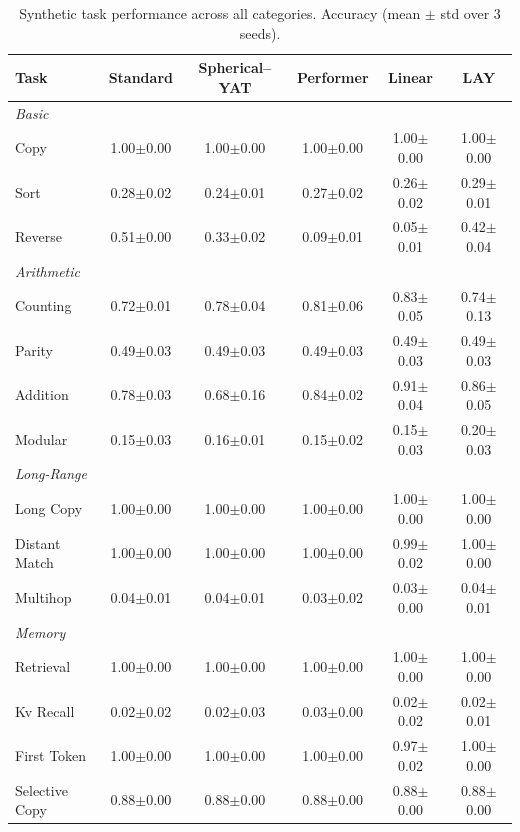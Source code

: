 \documentclass{article}
\begin{document}
\setlength{\textfloatsep}{8pt}
\begin{table}[t]
\centering
\small
\caption{Synthetic task performance across all categories. Accuracy (mean $\pm$ std over 3 seeds).}
\label{tab:tasks-all}
\begin{tabular}{lccccc}
\toprule
Task & Standard & Spherical--YAT & Performer & Linear & LAY \\
\midrule
\multicolumn{6}{l}{\emph{Basic}} \\
Copy            & 1.00$\pm$0.00 & 1.00$\pm$0.00 & 1.00$\pm$0.00 & 1.00$\pm$0.00 & 1.00$\pm$0.00 \\
Sort            & 0.28$\pm$0.02 & 0.24$\pm$0.01 & 0.27$\pm$0.02 & 0.26$\pm$0.02 & 0.29$\pm$0.01 \\
Reverse         & 0.51$\pm$0.00 & 0.33$\pm$0.02 & 0.09$\pm$0.01 & 0.05$\pm$0.01 & 0.42$\pm$0.04 \\
\midrule
\multicolumn{6}{l}{\emph{Arithmetic}} \\
Counting        & 0.72$\pm$0.01 & 0.78$\pm$0.04 & 0.81$\pm$0.06 & 0.83$\pm$0.05 & 0.74$\pm$0.13 \\
Parity          & 0.49$\pm$0.03 & 0.49$\pm$0.03 & 0.49$\pm$0.03 & 0.49$\pm$0.03 & 0.49$\pm$0.03 \\
Addition        & 0.78$\pm$0.03 & 0.68$\pm$0.16 & 0.84$\pm$0.02 & 0.91$\pm$0.04 & 0.86$\pm$0.05 \\
Modular         & 0.15$\pm$0.03 & 0.16$\pm$0.01 & 0.15$\pm$0.02 & 0.15$\pm$0.03 & 0.20$\pm$0.03 \\
\midrule
\multicolumn{6}{l}{\emph{Long-Range}} \\
Long Copy       & 1.00$\pm$0.00 & 1.00$\pm$0.00 & 1.00$\pm$0.00 & 1.00$\pm$0.00 & 1.00$\pm$0.00 \\
Distant Match   & 1.00$\pm$0.00 & 1.00$\pm$0.00 & 1.00$\pm$0.00 & 0.99$\pm$0.02 & 1.00$\pm$0.00 \\
Multihop        & 0.04$\pm$0.01 & 0.04$\pm$0.01 & 0.03$\pm$0.02 & 0.03$\pm$0.00 & 0.04$\pm$0.01 \\
\midrule
\multicolumn{6}{l}{\emph{Memory}} \\
Retrieval       & 1.00$\pm$0.00 & 1.00$\pm$0.00 & 1.00$\pm$0.00 & 1.00$\pm$0.00 & 1.00$\pm$0.00 \\
Kv Recall       & 0.02$\pm$0.02 & 0.02$\pm$0.03 & 0.03$\pm$0.00 & 0.02$\pm$0.02 & 0.02$\pm$0.01 \\
First Token     & 1.00$\pm$0.00 & 1.00$\pm$0.00 & 1.00$\pm$0.00 & 0.97$\pm$0.02 & 1.00$\pm$0.00 \\
Selective Copy  & 0.88$\pm$0.00 & 0.88$\pm$0.00 & 0.88$\pm$0.00 & 0.88$\pm$0.00 & 0.88$\pm$0.00 \\

\end{tabular}
\end{table}
\end{document}
